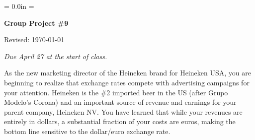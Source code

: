 \documentclass[letterpaper,12pt]{article}
\def\HeadName{Group Project \#9}
\begin{document}
\parindent = 0.0in
\parskip = \bigskipamount
\thispagestyle{empty}%
\Head

\centerline{\large \bf \HeadName}%
\centerline{Revised:  \today}

\medskip
{\it Due April 27 at the start of class. }
\medskip

As the new marketing director of the Heineken brand for Heineken USA, 
you are beginning to realize that exchange rates compete with 
advertising campaigns for your attention.  
Heineken is the \#2 imported beer in the US  
(after Grupo Modelo's Corona)  
and an important source of revenue and earnings 
for your parent company, Heineken NV.   
You have learned that while your revenues are entirely in dollars, 
a substantial fraction of your costs are euros,   
making the bottom line sensitive to the dollar/euro exchange rate.  
\end{document}

